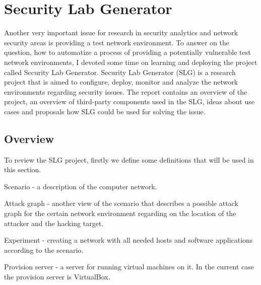 %


\section{Security Lab Generator}
Another very important issue for research in security analytics and network security areas is providing a test network environment. To answer on the question, how to automatize a process of providing a potentially vulnerable test network environments, I devoted some time on learning and deploying the project called Security Lab Generator. Security Lab Generator (SLG) is a research project that is aimed to configure, deploy, monitor and analyze the network environments regarding security issues. The report contains an overview of the project, an overview of third-party components used in the SLG, ideas about use cases and proposals how SLG could be used for solving the issue.

\subsection{Overview}

To review the SLG project, firstly we define some definitions that will be used in this section. 

\begin{compactitem}
\item Scenario - a description of the computer network. 
\item Attack graph - another view of the scenario that describes a possible attack graph for the certain network environment regarding on the location of the attacker and the hacking target.   
\item Experiment - creating a network with all needed hosts and software applications according to the scenario.
\item Provision server - a server for running virtual machines on it. In the current case the provision server  is VirtualBox.
\end{compactitem}

